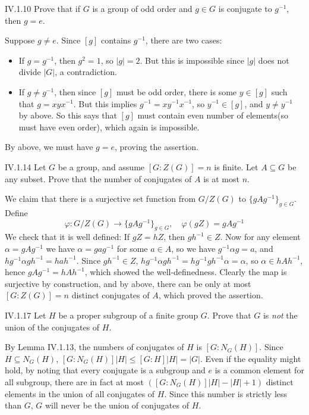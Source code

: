 \begin{problem}{IV.1.10}
Prove that if $G$ is a group of odd order and $g \in G$ is conjugate to $g^{-1}$, then $g = e$.
\end{problem}
\begin{pf}
Suppose $g \neq e$. Since $[g]$ contains $g^{-1}$, there are two cases:
\begin{itemize}
\item If $g = g^{-1}$, then $g^2 = 1$, so $|g| = 2$. But this is impossible since $|g|$ does not divide $|G|$, a contradiction.
\item If $g \neq g^{-1}$, then since $[g]$ must be odd order, there is some $y \in [g]$ such that $g = xyx^{-1}$. But this implies $g^{-1} = xy^{-1}x^{-1}$, so $y^{-1} \in [g]$, and $y \neq y^{-1}$ by above. So this says that $[g]$ must contain even number of elements(so must have even order), which again is impossible. 
\end{itemize} 
By above, we must have $g = e$, proving the assertion.
\end{pf}

\begin{problem}{IV.1.14}
Let $G$ be a group, and assume $[G : Z(G)] = n$ is finite. Let $A \subseteq G$ be any subset. Prove that the number of conjugates of $A$ is at most $n$.
\end{problem}
\begin{pf}
We claim that there is a surjective set function from $G/Z(G)$ to $\{gAg^{-1}\}_{g \in G}$. Define
\[
\varphi : G/Z(G) \to \{gAg^{-1}\}_{g \in G}, \quad \varphi(gZ) = gAg^{-1}
\]
We check that it is well defined: If $gZ = hZ$, then $gh^{-1} \in Z$. Now for any element $\alpha = gAg^{-1}$ we have $\alpha = gag^{-1}$ for some $a \in A$, so we have $g^{-1}\alpha g = a$, and $hg^{-1} \alpha gh^{-1} = hah^{-1}$. Since $gh^{-1} \in Z$, $hg^{-1} \alpha gh^{-1} = hg^{-1} gh^{-1} \alpha = \alpha$, so $\alpha \in hAh^{-1}$, hence $gAg^{-1} = hAh^{-1}$, which showed the well-definedness. Clearly the map is surjective by construction, and by above, there can be only at most $[G:Z(G)] = n$ distinct conjugates of $A$, which proved the assertion.
\end{pf}


\begin{problem}{IV.1.17}
Let $H$ be a proper subgroup of a finite group $G$. Prove that $G$ is \emph{not} the union of the conjugates of $H$.
\end{problem}
\begin{pf}
By Lemma IV.1.13, the numbers of conjugates of $H$ is $[G:N_G(H)]$. Since $H \subseteq N_G(H)$, $[G:N_G(H)]|H| \leq [G:H]|H| = |G|$. Even if the equality might hold, by noting that every conjugate is a subgroup and $e$ is a common element for all subgroup, there are in fact at most $([G:N_G(H)]|H| - |H| + 1)$ distinct elements in the union of all conjugates of $H$. Since this number is strictly less than $G$, $G$ will never be the union of conjugates of $H$.
\end{pf}

